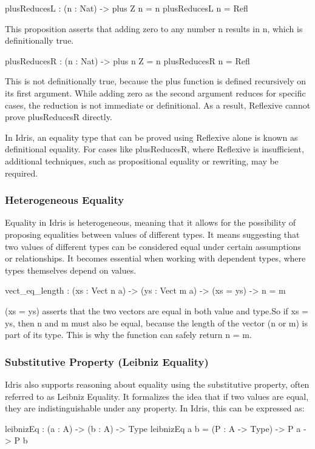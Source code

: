 \documentclass[]{rptuseminar}
\begin{document}
\begin{idris}
    plusReducesL : (n : Nat) -> plus Z n = n
    plusReducesL n = Refl
\end{idris}
This proposition asserts that adding zero to any number n results in n, which is definitionally true.
\begin{idris}
    plusReducesR : (n : Nat) -> plus n Z = n
    plusReducesR n = Refl
\end{idris}
This is not definitionally true, because the plus function is defined recursively on its first argument. While adding zero as the second argument reduces for specific cases, the reduction is not immediate or definitional. As a result, Reflexive cannot prove plusReducesR directly.

In Idris, an equality type that can be proved using Reflexive alone is known as definitional equality. For cases like plusReducesR, where Reflexive is insufficient, additional techniques, such as propositional equality or rewriting, may be required.
\subsubsection{Heterogeneous Equality}
Equality in Idris is heterogeneous, meaning that it allows for the possibility of proposing equalities between values of different types. It means suggesting that two values of different types can be considered equal under certain assumptions or relationships. It becomes essential when working with dependent types, where types themselves depend on values.
\begin{idris}
    vect_eq_length : (xs : Vect n a) -> (ys : Vect m a) ->
    (xs = ys) -> n = m 
\end{idris}
(xs = ys) asserts that the two vectors are equal in both value and type.So if xs = ys, then n and m must also be equal, because the length of the vector (n or m) is part of its type. This is why the function can safely return n = m.
\subsubsection{Substitutive Property (Leibniz Equality)}
Idris also supports reasoning about equality using the substitutive property, often referred to as Leibniz Equality.
It formalizes the idea that if two values are equal, they are indistinguishable under any property. In Idris, this can be expressed as:
\begin{idris}
leibnizEq : (a : A) -> (b : A) -> Type
leibnizEq a b = (P : A -> Type) -> P a -> P b
\end{idris}
\end{document}
